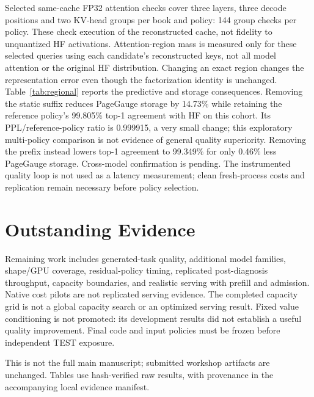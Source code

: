 \documentclass{article}
\begin{document}
Selected same-cache FP32 attention checks cover three layers, three decode
positions and two KV-head groups per book and policy: 144 group checks per
policy. These check execution of the reconstructed cache, not fidelity to
unquantized HF activations. Attention-region mass is measured only for these
selected queries using each candidate's reconstructed keys, not all model
attention or the original HF distribution. Changing an exact region changes
the representation error even though the factorization identity is unchanged.
Table~\ref{tab:regional} reports the predictive and storage consequences.
Removing the static suffix reduces PageGauge storage by 14.73\% while
retaining the reference policy's 99.805\% top-1 agreement with HF on this
cohort. Its PPL/reference-policy ratio is 0.999915, a very small change;
this exploratory multi-policy comparison is not evidence of general quality
superiority. Removing the prefix instead lowers top-1 agreement to 99.349\%
for only 0.46\% less PageGauge storage. Cross-model confirmation is pending.
The instrumented quality loop is not used as a latency measurement; clean
fresh-process costs and replication remain necessary before policy selection.

\section{Outstanding Evidence}
Remaining work includes generated-task quality, additional model families,
shape/GPU coverage, residual-policy timing, replicated post-diagnosis
throughput, capacity boundaries, and realistic serving with prefill and
admission. Native cost pilots are not replicated serving evidence. The completed
capacity grid is not a global capacity search or an optimized serving result.
Fixed value conditioning is not promoted: its development results did not
establish a useful quality improvement. Final code and input policies must
be frozen before independent TEST exposure.

This is not the full main manuscript; submitted workshop artifacts are
unchanged. Tables use hash-verified raw results, with provenance in the
accompanying local evidence manifest.
\end{document}
